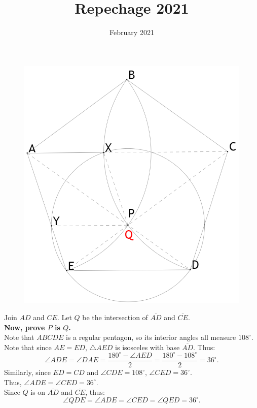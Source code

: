 \documentclass{article}
\title{Repechage 2021}
\date{February 2021}
\begin{document}
\begin{figure}[htp]
    \centering
    \includegraphics[scale=1]{Q3_img}
    \label{fig:diagram}
\end{figure}
Join $AD$ and $CE$.
Let $Q$ be the intersection of $\overline{AD}$ and $\overline{CE}$. \\
\textbf{Now, prove $P$ is $Q$.} \\

Note that $ABCDE$ is a regular pentagon, so its interior angles all measure $108^\circ$. \\
Note that since $AE = ED$, $\triangle AED$ is isosceles with base $\overline{AD}$. Thus:
$$\angle ADE = \angle DAE = \frac{180^\circ-\angle AED}{2} = \frac{180^\circ-108^\circ}{2} = 36^\circ.$$
Similarly, since $ED = CD$ and $\angle CDE = 108^\circ$, $\angle CED = 36^\circ$. \\
Thus, $\angle ADE = \angle CED = 36^\circ$. \\
Since $Q$ is on $\overline{AD}$ and $\overline{CE}$, thus:
$$\angle QDE = \angle ADE = \angle CED = \angle QED = 36^\circ.$$
\end{document}
